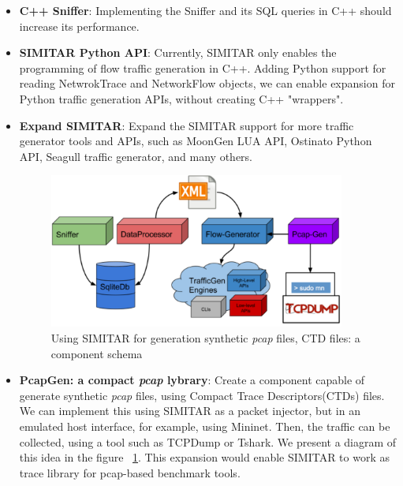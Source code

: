 \begin{itemize}
	
	\item \textbf{C++ Sniffer}: Implementing the Sniffer and its SQL queries in C++ should increase its performance.
	
	
	\item \textbf{SIMITAR Python API}: Currently, SIMITAR only enables the programming of flow traffic generation in C++. Adding Python support for reading NetwrokTrace and NetworkFlow objects, we can enable expansion for Python traffic generation APIs, without creating C++ "wrappers".
	
	\item \textbf{Expand SIMITAR}: Expand the SIMITAR support for more traffic generator tools and APIs, such as MoonGen LUA API, Ostinato Python API, Seagull traffic generator, and many others.
	
	\begin{figure}[!ht]
		\centering
		\includegraphics[height=2.0in]{figures/ch6/pcap-gen}
		\caption{Using SIMITAR for generation synthetic \textit{pcap} files, CTD files: a component schema}
		\label{fig:pcap-gen}
	\end{figure}
	
	\item \textbf{PcapGen: a compact \textit{pcap} lybrary}: Create a component capable of generate synthetic \textit{pcap} files, using Compact Trace Descriptors(CTDs) files. We can implement this using SIMITAR as a packet injector, but in an emulated host interface, for example, using Mininet. Then, the traffic can be collected, using a tool such as TCPDump or Tshark. We present a diagram of this idea in the figure ~\ref{fig:pcap-gen}. This expansion would enable SIMITAR  to work as trace library for pcap-based benchmark tools.
	
	
	
\end{itemize}


